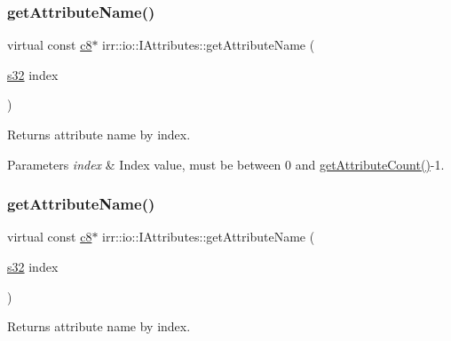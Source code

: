 \subsubsection{\texorpdfstring{get\+Attribute\+Name()}{getAttributeName()}\hspace{0.1cm}{\footnotesize\ttfamily [1/2]}}
{\footnotesize\ttfamily virtual const \hyperlink{namespaceirr_a9395eaea339bcb546b319e9c96bf7410}{c8}$\ast$ irr\+::io\+::\+I\+Attributes\+::get\+Attribute\+Name (\begin{DoxyParamCaption}\item[{\hyperlink{namespaceirr_ac66849b7a6ed16e30ebede579f9b47c6}{s32}}]{index }\end{DoxyParamCaption})\hspace{0.3cm}{\ttfamily [pure virtual]}}



Returns attribute name by index. 


\begin{DoxyParams}{Parameters}
{\em index} & Index value, must be between 0 and \hyperlink{classirr_1_1io_1_1IAttributes_a796bdd9440ee7ba0b6742a90a82870b6}{get\+Attribute\+Count()}-\/1. \\
\hline
\end{DoxyParams}
\mbox{\label{classirr_1_1io_1_1IAttributes_adee33f518d95a1ca17146bb055c6e5f3}} 
\subsubsection{\texorpdfstring{get\+Attribute\+Name()}{getAttributeName()}\hspace{0.1cm}{\footnotesize\ttfamily [2/2]}}
{\footnotesize\ttfamily virtual const \hyperlink{namespaceirr_a9395eaea339bcb546b319e9c96bf7410}{c8}$\ast$ irr\+::io\+::\+I\+Attributes\+::get\+Attribute\+Name (\begin{DoxyParamCaption}\item[{\hyperlink{namespaceirr_ac66849b7a6ed16e30ebede579f9b47c6}{s32}}]{index }\end{DoxyParamCaption})\hspace{0.3cm}{\ttfamily [pure virtual]}}



Returns attribute name by index. 


